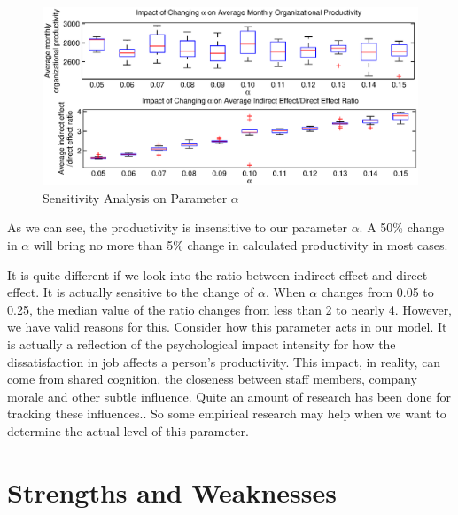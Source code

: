 \documentclass[tcn = 37075, sheet = false, abstract = false]{mcmthesis}
\begin{document}
\begin{figure}[htb!]
\centering
\includegraphics[width=16cm]{Sensitivity.eps}
\caption{Sensitivity Analysis on Parameter $\alpha$} 
\label{fig:2}
\end{figure}

As we can see, the productivity is insensitive to our parameter $\alpha$. A 50\% change in $\alpha$ will bring no more than 5\% change in calculated productivity in most cases. 

It is quite different if we look into the ratio between indirect effect and direct effect. It is actually sensitive to the change of $\alpha$. When $\alpha$ changes from 0.05 to 0.25, the median value of the ratio changes from less than 2 to nearly 4. However, we have valid reasons for this. Consider how this parameter acts in our model. It is actually a reflection of the psychological impact intensity for how the dissatisfaction in job affects a person's productivity. This impact, in reality, can come from shared cognition, the closeness between staff members, company morale and other subtle influence. Quite an amount of research has been done for tracking these influences.\cite{seligman2000positive}. So some empirical research may help when we want to determine the actual level of this parameter.

\section{Strengths and Weaknesses}
\end{document}
